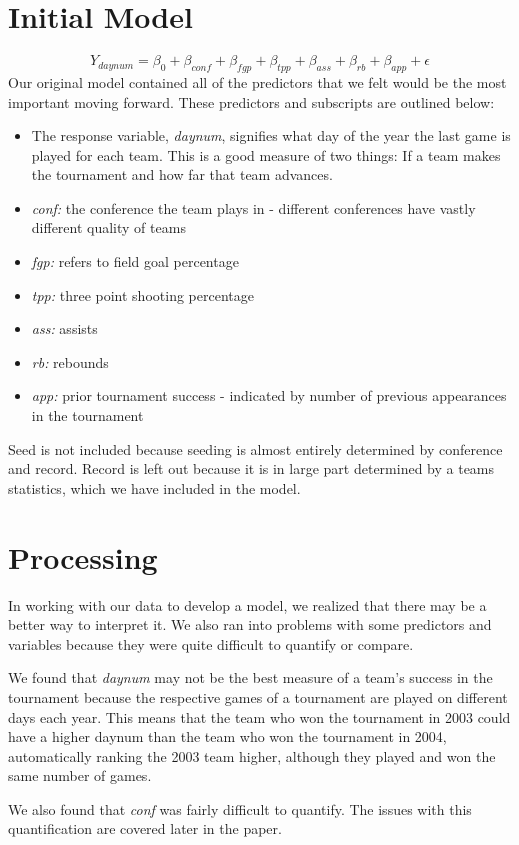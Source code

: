 \documentclass[]{scrartcl}
\begin{document}
\section*{Initial Model}
	\[
Y_{daynum} = \beta_0 + \beta_{conf} + \beta_{fgp} +\beta_{tpp} + \beta_{ass} + \beta_{rb} + \beta_{app} + \epsilon
\]
Our original model contained all of the predictors that we felt would be the most important moving forward. These predictors and subscripts are outlined below:
	\begin{itemize}
	\item The response variable, {\textit{daynum}}, signifies what day of the year the last game is played for each team. This is a good measure of two things: If a team makes the tournament and how far that team advances.
	\item 	{\textit{conf:}} the conference the team plays in - different conferences have vastly different quality of teams
	\item 	{\textit{fgp:}} refers to field goal percentage
	\item 	{\textit{tpp:}} three point shooting percentage
	\item 	{\textit{ass:}} assists
	\item 	{\textit{rb:}} rebounds
	\item 	{\textit{app:}} prior tournament success - indicated by number of previous appearances in the tournament
	\end{itemize}
Seed is not included because seeding is almost entirely determined by conference and record. Record is left out because it is in large part determined by a teams statistics, which we have included in the model.
\section*{Processing}
In working with our data to develop a model, we realized that there may be a better way to interpret it. We also ran into problems with some predictors and variables because they were quite difficult to quantify or compare.

We found that {\textit{daynum}} may not be the best measure of a team's success in the tournament because the respective games of a tournament are played on different days each year. This means that the team who won the tournament in 2003 could have a higher daynum than the team who won the tournament in 2004, automatically ranking the 2003 team higher, although they played and won the same number of games.

We also found that {\textit{conf}} was fairly difficult to quantify. The issues with this quantification are covered later in the paper.
\end{document}
